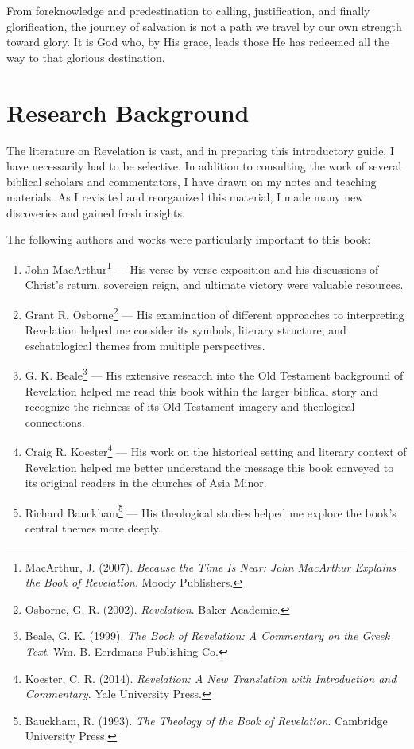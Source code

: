 From foreknowledge and predestination to calling, justification, and finally glorification, the journey of salvation is not a path we travel by our own strength toward glory. It is God who, by His grace, leads those He has redeemed all the way to that glorious destination.

\section*{Research Background}

The literature on Revelation is vast, and in preparing this introductory guide, I have necessarily had to be selective. In addition to consulting the work of several biblical scholars and commentators, I have drawn on my notes and teaching materials.
As I revisited and reorganized this material, I made many new discoveries and gained fresh insights. 

The following authors and works were particularly important to this book:

\begin{enumerate}
    \item John MacArthur\footnote{MacArthur, J. (2007). \textit{Because the Time Is Near: John MacArthur Explains the Book of Revelation}. Moody Publishers.} --- His verse-by-verse exposition and his discussions of Christ's return, sovereign reign, and ultimate victory were valuable resources.

    \item Grant R. Osborne\footnote{Osborne, G. R. (2002). \textit{Revelation}. Baker Academic.} --- His examination of different approaches to interpreting Revelation helped me consider its symbols, literary structure, and eschatological themes from multiple perspectives.

    \item G. K. Beale\footnote{Beale, G. K. (1999). \textit{The Book of Revelation: A Commentary on the Greek Text}. Wm. B. Eerdmans Publishing Co.} --- His extensive research into the Old Testament background of Revelation helped me read this book within the larger biblical story and recognize the richness of its Old Testament imagery and theological connections.

    \item Craig R. Koester\footnote{Koester, C. R. (2014). \textit{Revelation: A New Translation with Introduction and Commentary}. Yale University Press.} --- His work on the historical setting and literary context of Revelation helped me better understand the message this book conveyed to its original readers in the churches of Asia Minor.

    \item Richard Bauckham\footnote{Bauckham, R. (1993). \textit{The Theology of the Book of Revelation}. Cambridge University Press.} --- His theological studies helped me explore the book's central themes more deeply.
\end{enumerate}


